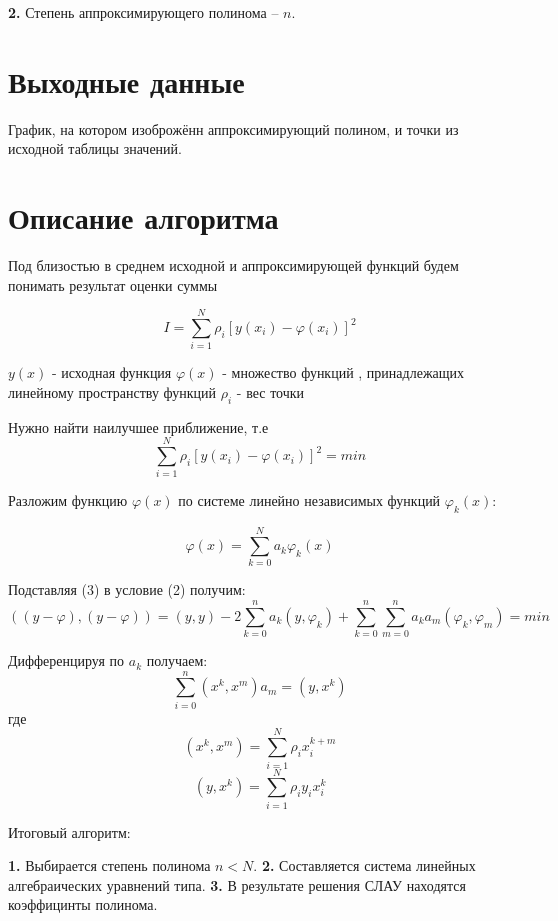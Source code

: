 \documentclass[a4paper,12pt]{article}
\begin{document}
\noindent\textbf{2.} Степень аппроксимирующего полинома -- $n$.
\section{Выходные данные}
\noindent\textbf{}График, на котором изоброжённ аппроксимирующий полином, и точки из исходной таблицы значений. 

\clearpage
\section{Описание алгоритма}
\begin{flushleft}
Под близостью в среднем исходной и аппроксимирующей  функций будем понимать результат оценки суммы 

\begin{equation}
	I = \sum_{i=1}^{N} \rho_{i}[y(x_{i}) - \varphi(x_{i})]^2
	\label{eq:ref}
\end{equation}

$y(x)$ - исходная функция\newline
$\varphi(x)$ - множество функций , принадлежащих линейному пространству функций\newline
$\rho_{i}$ - вес точки\newline

Нужно найти наилучшее приближение, т.е
\begin{equation}
	\sum_{i=1}^{N} \rho_{i}[y(x_{i}) - \varphi(x_{i})]^2 = min
	\label{eq:ref}
\end{equation}

Разложим функцию $\varphi(x)$ по системе линейно независимых функций $\varphi_{k}(x)$:

\begin{equation}
	\varphi(x) = \sum_{k=0}^{N}a_{k}\varphi_{k}(x)
	\label{eq:ref}
\end{equation}

Подставляя (3) в условие (2) получим:
\begin{equation}
	((y - \varphi), (y - \varphi)) = (y, y) - 2\sum_{k=0}^{n}a_{k}(y,\varphi_{k}) + \sum_{k=0}^{n}\sum_{m=0}^{n}a_{k}a_{m}(\varphi_{k},\varphi_{m}) = min
	\label{eq:ref}
\end{equation}

Дифференцируя по $a_{k}$ получаем:
\begin{equation}
	\sum_{i=0}^{n}(x^k, x^m)a_{m} = (y, x^k)
	\label{eq:ref}
\end{equation}
где
$$(x^k, x^m) = \sum_{i=1}^{N}\rho_{i}x_{i}^{k+m}$$
$$(y, x^k) = \sum_{i=1}^{N}\rho_{i}y_{i}x_{i}^{k}$$\newline

Итоговый алгоритм: 

\noindent\textbf{1.} Выбирается степень полинома $n < N$. \newline
\noindent\textbf{2.} Составляется система линейных алгебраических уравнений типа.\newline
\noindent\textbf{3.} В результате решения СЛАУ находятся коэффицинты полинома.
\end{flushleft}
\end{document}

